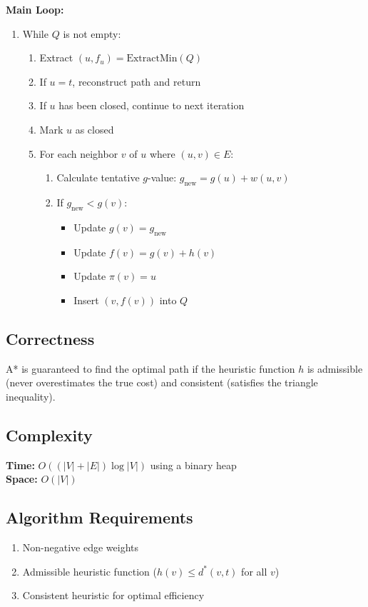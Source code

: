 \documentclass{article}
\begin{document}
\textbf{Main Loop:}
\begin{enumerate}
    \item While $Q$ is not empty:
    \begin{enumerate}
        \item Extract $(u, f_u) = \text{ExtractMin}(Q)$
        \item If $u = t$, reconstruct path and return
        \item If $u$ has been closed, continue to next iteration
        \item Mark $u$ as closed
        \item For each neighbor $v$ of $u$ where $(u,v) \in E$:
        \begin{enumerate}
            \item Calculate tentative $g$-value: $g_{\text{new}} = g(u) + w(u,v)$
            \item If $g_{\text{new}} < g(v)$:
            \begin{itemize}
                \item Update $g(v) = g_{\text{new}}$
                \item Update $f(v) = g(v) + h(v)$
                \item Update $\pi(v) = u$
                \item Insert $(v, f(v))$ into $Q$
            \end{itemize}
        \end{enumerate}
    \end{enumerate}
\end{enumerate}

\subsection{Correctness}
A* is guaranteed to find the optimal path if the heuristic function $h$ is admissible (never overestimates the true cost) and consistent (satisfies the triangle inequality).

\subsection{Complexity}
\textbf{Time:} $O((|V| + |E|) \log |V|)$ using a binary heap\\
\textbf{Space:} $O(|V|)$

\subsection{Algorithm Requirements}
\begin{enumerate}
    \item Non-negative edge weights
    \item Admissible heuristic function ($h(v) \leq d^*(v,t)$ for all $v$)
    \item Consistent heuristic for optimal efficiency
\end{enumerate}
\end{document}
